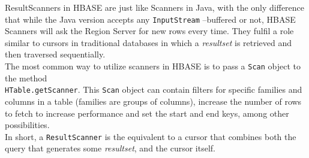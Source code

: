\documentclass[a4paper,10pt]{article}
\begin{document}
ResultScanners in HBASE are just like Scanners in Java, with the only difference that while the Java version accepts any \texttt{InputStream} --buffered or not, HBASE Scanners will ask the Region Server for new rows every time. They fulfil a role similar to cursors in traditional databases in which a \textit{resultset} is retrieved and then traversed sequentially.\\

The most common way to utilize scanners in HBASE is to pass a \texttt{Scan} object to the method \\\texttt{HTable.getScanner}. This \texttt{Scan} object can contain filters for specific families and columns in a table (families are groups of columns), increase the number of rows to fetch to increase performance and set the start and end keys, among other possibilities.\\

In short, a \texttt{ResultScanner} is the equivalent to a cursor that combines both the query that generates some \textit{resultset}, and the cursor itself.
\end{document}
